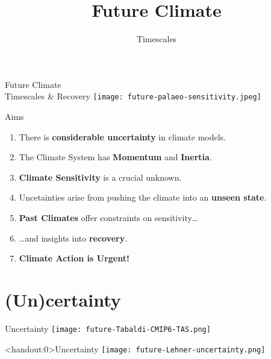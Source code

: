 

\title{Future Climate}
\author{Timescales}




\begin{frame}{Future Climate\\Timescales \& Recovery}
    \texttt{[image: future-palaeo-sensitivity.jpeg]}
\end{frame}

\begin{frame}{Aims}

    \begin{enumerate}
        \item There is \textbf{considerable uncertainty} in climate models.
        \item The Climate System has \textbf{Momentum} and \textbf{Inertia}.
        \item \textbf{Climate Sensitivity} is a crucial unknown.
        \item Uncetainties arise from pushing the climate into an \textbf{unseen state}.
        \item \textbf{Past Climates} offer constraints on sensitivity\dots
        \item \dots and insights into \textbf{recovery}.
        \item \textbf{Climate Action is Urgent!}
    \end{enumerate}

\end{frame}

\section{(Un)certainty}

\begin{frame}{Uncertainty}
    \centering
    \texttt{[image: future-Tabaldi-CMIP6-TAS.png]}
\end{frame}

\begin{frame}<handout:0>{Uncertainty}
    \centering
    \texttt{[image: future-Lehner-uncertainty.png]}
\end{frame}

